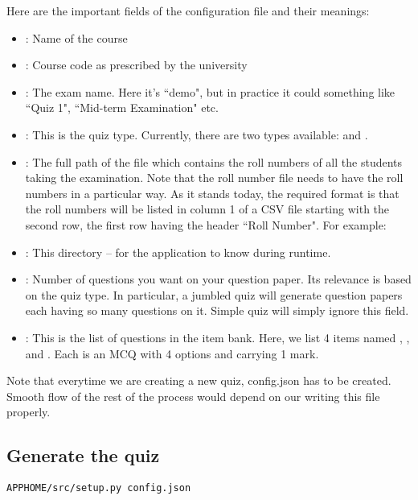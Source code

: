 \documentclass[12pt]{report}
\makeatletter
\newcommand{\kctt}[1]{{\color{Red}{\lstinline[basicstyle=\ttfamily, mathescape=true]@#1@}}}
\makeatother
\begin{document}
Here are the important fields of the configuration file and their meanings:
\begin{itemize}
\item \kctt{course name}: Name of the course
\item \kctt{course code}: Course code as prescribed by the university
\item \kctt{assessment name}: The exam name. Here it's ``demo", but in practice it could something like ``Quiz 1", ``Mid-term Examination" etc.
\item \kctt{assessment type}: This is the quiz type. Currently, there are two types available: \kctt{simple} and \kctt{jumbled}.
\item \kctt{roll number file}: The full path of the file which contains the roll numbers of all the students taking the examination. Note that the roll number file needs to have the roll numbers in a particular way. As it stands today, the required format is that the roll numbers will be listed in column 1 of a CSV file starting with the second row, the first row having the header ``Roll Number". For example:

\item \kctt{assessment home}: This directory -- for the application to know during runtime.
\item \kctt{number of items per assessment instrument}: Number of questions you want on your question paper. Its relevance is based on the quiz type. In particular, a jumbled quiz will generate question papers each having so many questions on it. Simple quiz will simply ignore this field.
\item \kctt{items}: This is the list of questions in the item bank. Here, we list 4 items named \kctt{item1}, \kctt{item2}, \kctt{item3} and \kctt{item4}. Each is an MCQ with 4 options and carrying 1 mark.  
\end{itemize}

Note that everytime we are creating a new quiz, config.json has to be created. Smooth flow of the rest of the process would depend on our writing this file properly.

\subsection{Generate the quiz}

\begin{lstlisting}[style=oc]
APPHOME/src/setup.py config.json
\end{lstlisting}
\end{document}
